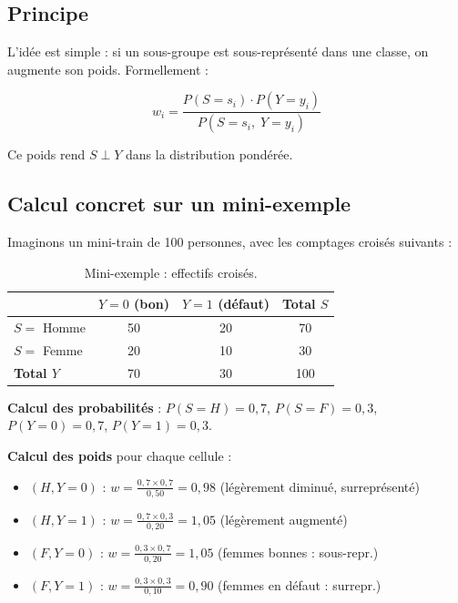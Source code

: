 \documentclass[11pt, a4paper]{article}
\begin{document}
\subsection{Principe}

L'id\'{e}e est simple : si un sous-groupe est sous-repr\'{e}sent\'{e} dans une classe, on augmente son poids. Formellement :

$$w_i = \frac{P(S = s_i) \cdot P(Y = y_i)}{P(S = s_i,\; Y = y_i)}$$

\noindent Ce poids rend $S \perp Y$ dans la distribution pond\'{e}r\'{e}e.

\subsection{Calcul concret sur un mini-exemple}

Imaginons un mini-train de 100 personnes, avec les comptages crois\'{e}s suivants :

\begin{table}[H]
\centering
\begin{tabular}{lccc}
\toprule
& $Y = 0$ (bon) & $Y = 1$ (d\'{e}faut) & \textbf{Total $S$} \\
\midrule
$S = $ Homme & 50 & 20 & 70 \\
$S = $ Femme & 20 & 10 & 30 \\
\midrule
\textbf{Total $Y$} & 70 & 30 & 100 \\
\bottomrule
\end{tabular}
\caption{Mini-exemple : effectifs crois\'{e}s.}
\end{table}

\noindent\textbf{Calcul des probabilit\'{e}s} :
$P(S{=}H) = 0{,}7$, $P(S{=}F) = 0{,}3$, $P(Y{=}0) = 0{,}7$, $P(Y{=}1) = 0{,}3$.

\noindent\textbf{Calcul des poids} pour chaque cellule :
\begin{itemize}
    \item $(H, Y{=}0)$ : $w = \frac{0{,}7 \times 0{,}7}{0{,}50} = 0{,}98$ \quad (l\'{e}g\`{e}rement diminu\'{e}, surrepr\'{e}sent\'{e})
    \item $(H, Y{=}1)$ : $w = \frac{0{,}7 \times 0{,}3}{0{,}20} = 1{,}05$ \quad (l\'{e}g\`{e}rement augment\'{e})
    \item $(F, Y{=}0)$ : $w = \frac{0{,}3 \times 0{,}7}{0{,}20} = 1{,}05$ \quad (femmes \og bonnes \fg{} : sous-repr.)
    \item $(F, Y{=}1)$ : $w = \frac{0{,}3 \times 0{,}3}{0{,}10} = 0{,}90$ \quad (femmes en d\'{e}faut : surrepr.)
\end{itemize}
\end{document}
